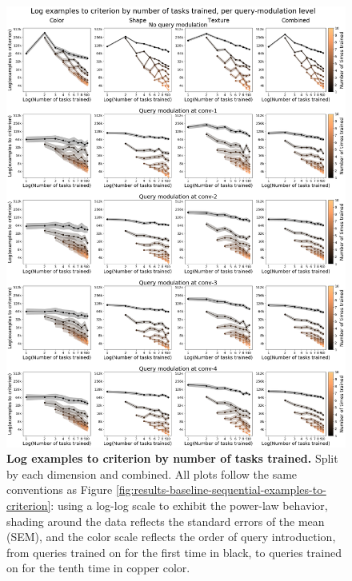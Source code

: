 \begin{figure}[!htb]
\centering
\includegraphics[width=\linewidth]{ch-results/figures/query_mod_benchmark/examples_to_criterion_per_modualtion_level_tasks_trained.png}
\caption{ {\bf Log examples to criterion by number of tasks trained.} Split by each dimension and combined. All plots follow the same conventions as Figure \ref{fig:results-baseline-sequential-examples-to-criterion}: using a log-log scale to exhibit the power-law behavior, shading around the data reflects the standard errors of the mean (SEM), and the color scale reflects the order of query introduction, from queries trained on for the first time in black, to queries trained on for the tenth time in copper color.}
\label{fig:results-query-mod-benchmark-examples-to-criterion-per-modualtion-level-tasks-trained}
\end{figure}

